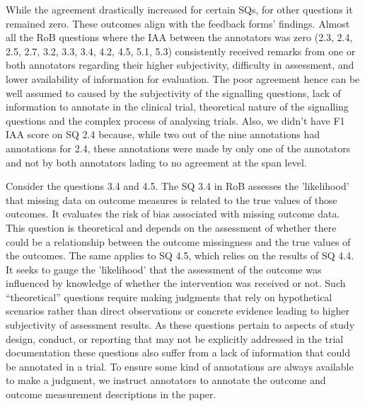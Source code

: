 \documentclass[sn-mathphys,Numbered]{sn-jnl}%
\theoremstyle{thmstyleone}%
\theoremstyle{thmstyletwo}%
\theoremstyle{thmstylethree}%
\begin{document}
While the agreement drastically increased for certain SQs, for other questions it remained zero.
These outcomes align with the feedback forms' findings.
Almost all the RoB questions where the IAA between the annotators was zero (2.3, 2.4, 2.5, 2.7, 3.2, 3.3, 3.4, 4.2, 4.5, 5.1, 5.3) consistently received remarks from one or both annotators regarding their higher subjectivity, difficulty in assessment, and lower availability of information for evaluation.
The poor agreement hence can be well assumed to caused by the subjectivity of the signalling questions, lack of information to annotate in the clinical trial, theoretical nature of the signalling questions and the complex process of analysing trials.
Also, we didn't have F1 IAA score on SQ 2.4 because, while two out of the nine annotations had annotations for 2.4, these annotations were made by only one of the annotators and not by both annotators lading to no agreement at the span level.


Consider the questions 3.4 and 4.5.
The SQ 3.4 in RoB assesses the 'likelihood' that missing data on outcome measures is related to the true values of those outcomes. 
It evaluates the risk of bias associated with missing outcome data.
This question is theoretical and depends on the assessment of whether there could be a relationship between the outcome missingness and the true values of the outcomes.
The same applies to SQ 4.5, which relies on the results of SQ 4.4.
It seeks to gauge the 'likelihood' that the assessment of the outcome was influenced by knowledge of whether the intervention was received or not.
Such ``theoretical'' questions require making judgments that rely on hypothetical scenarios rather than direct observations or concrete evidence leading to higher subjectivity of assessment results.
As these questions pertain to aspects of study design, conduct, or reporting that may not be explicitly addressed in the trial documentation these questions also suffer from a lack of information that could be annotated in a trial.
To ensure some kind of annotations are always available to make a judgment, we instruct annotators to annotate the outcome and outcome measurement descriptions in the paper.
\end{document}
